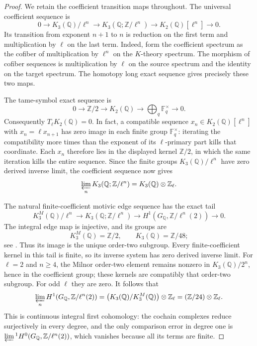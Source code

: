 \begin{proof}
We retain the coefficient transition maps throughout.
The universal coefficient sequence
\cite[IV.2.5]{GhostWeibelKbook} is
\[
 0\longrightarrow K_3(\mathbb Q)/\ell^n
 \longrightarrow K_3(\mathbb Q;\mathbb Z/\ell^n)
 \longrightarrow K_2(\mathbb Q)[\ell^n]
 \longrightarrow0.
\]
Its transition from exponent \(n+1\) to \(n\) is
reduction on the first term and multiplication by \(\ell\)
on the last term. Indeed, form the coefficient spectrum
as the cofiber of multiplication by \(\ell^n\) on the
\(K\)-theory spectrum. The morphism of cofiber sequences
is multiplication by \(\ell\) on the source spectrum
and the identity on the target spectrum. The homotopy
long exact sequence gives precisely these two maps.

The tame-symbol exact sequence
\cite[III.5.2.2, III.6.5.1]{GhostWeibelKbook} is
\[
 0\longrightarrow\mathbb Z/2\longrightarrow K_2(\mathbb Q)
 \longrightarrow\bigoplus_q\mathbb F_q^\times
 \longrightarrow0.
\]
Consequently \(T_\ell K_2(\mathbb Q)=0\).
In fact, a compatible sequence \(x_n\in K_2(\mathbb Q)[\ell^n]\)
with \(x_n=\ell x_{n+1}\) has zero image in each finite
group \(\mathbb F_q^\times\): iterating the compatibility
more times than the exponent of its \(\ell\)-primary
part kills that coordinate. Each \(x_n\) therefore lies
in the displayed kernel \(\mathbb Z/2\), in which the
same iteration kills the entire sequence. Since the
finite groups \(K_3(\mathbb Q)/\ell^n\) have zero
derived inverse limit, the coefficient sequence now gives
\[
 \varprojlim_n K_3(\mathbb Q;\mathbb Z/\ell^n)
       =K_3(\mathbb Q)\otimes\mathbb Z_\ell.
\]

The natural finite-coefficient motivic edge sequence
\cite[VI.4.3.1]{GhostWeibelKbook} has the exact tail
\[
 K_3^M(\mathbb Q)/\ell^n
 \longrightarrow K_3(\mathbb Q;\mathbb Z/\ell^n)
 \longrightarrow H^1(G_{\mathbb Q},\mathbb Z/\ell^n(2))
 \longrightarrow0.
\]
The integral edge map is injective, and its groups are
\[
 K_3^M(\mathbb Q)=\mathbb Z/2,
 \qquad K_3(\mathbb Q)=\mathbb Z/48;
\]
see \cite[VI.4.3.2, VI.5.2.1, VI.5.3]{GhostWeibelKbook}.
Thus its image is the unique order-two subgroup.
Every finite-coefficient kernel in this tail is finite,
so its inverse system has zero derived inverse limit.
For \(\ell=2\) and \(n\ge4\), the Milnor order-two
element remains nonzero in
\(K_3(\mathbb Q)/2^n\), hence in the coefficient group;
these kernels are compatibly that order-two subgroup.
For odd \(\ell\) they are zero. It follows that
\[
 \varprojlim_n H^1(G_{\mathbb Q},\mathbb Z/\ell^n(2))
 =\bigl(K_3(\mathbb Q)/K_3^M(\mathbb Q)\bigr)
                       \otimes\mathbb Z_\ell
 = (\mathbb Z/24)\otimes\mathbb Z_\ell.
\]
This is continuous integral first cohomology: the
cochain complexes reduce surjectively in every degree,
and the only comparison error in degree one is
\(\varprojlim{}^1 H^0(G_{\mathbb Q},\mathbb Z/\ell^n(2))\),
which vanishes because all its terms are finite.


\end{proof}
